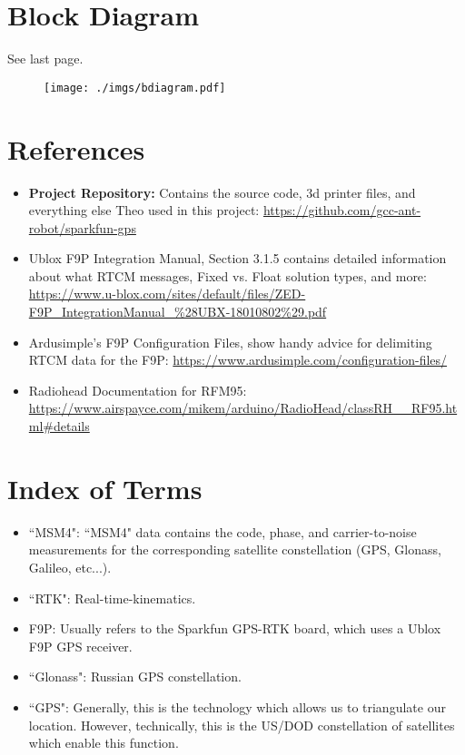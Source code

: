\documentclass{article}%
\begin{document}
\begin{appendices}
\section{Block Diagram}
See last page.

\begin{figure}[t]
\centering
\begin{minipage}{1.0\textwidth}
  \centering
  \texttt{[image: ./imgs/bdiagram.pdf]}
  \label{fig:diagram}
\end{minipage}%
\end{figure}

\section{References}
\begin{itemize}
	\item \textbf{Project Repository:} Contains the source code, 3d printer files, and everything else Theo used in this project: \url{https://github.com/gcc-ant-robot/sparkfun-gps}
	\item Ublox F9P Integration Manual, Section 3.1.5 contains detailed information about what RTCM messages, Fixed vs. Float solution types, and more: \\ \url{https://www.u-blox.com/sites/default/files/ZED-F9P_IntegrationManual_\%28UBX-18010802\%29.pdf}
	\item Ardusimple's F9P Configuration Files, show handy advice for delimiting RTCM data for the F9P: \url{https://www.ardusimple.com/configuration-files/}
	\item Radiohead Documentation for RFM95: \url{https://www.airspayce.com/mikem/arduino/RadioHead/classRH__RF95.html#details}
\end{itemize}

\section{Index of Terms}
\begin{itemize}
	\item ``MSM4": ``MSM4" data contains the code, phase, and carrier-to-noise measurements for the corresponding satellite constellation (GPS, Glonass, Galileo, etc...).
	\item ``RTK": Real-time-kinematics.
	\item F9P: Usually refers to the Sparkfun GPS-RTK board, which uses a Ublox F9P GPS receiver.
	\item ``Glonass": Russian GPS constellation.
	\item ``GPS": Generally, this is the technology which allows us to triangulate our location.  However, technically, this is the US/DOD constellation of satellites which enable this function. 
\end{itemize}
\end{appendices}
\end{document}

